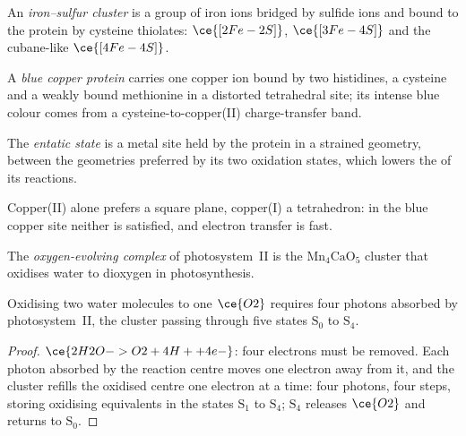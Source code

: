 \begin{definition}\label{def:b3:bioinorganic:fes}
An \emph{iron--sulfur cluster} is a group of iron
ions bridged by sulfide ions and bound to the protein by cysteine thiolates:
$\ce{[2Fe-2S]}$, $\ce{[3Fe-4S]}$ and the cubane-like $\ce{[4Fe-4S]}$.
\end{definition}

\begin{definition}\label{def:b3:bioinorganic:blue-copper}
A \emph{blue copper protein} carries one copper
ion bound by two histidines, a cysteine and a weakly bound methionine in a
distorted tetrahedral site; its intense blue colour comes from a
cysteine-to-copper(II) charge-transfer band.
\end{definition}

\begin{definition}\label{def:b3:bioinorganic:entatic}
The \emph{entatic state} is a metal site held by the
protein in a strained geometry, between the geometries preferred by its two
oxidation states, which lowers the  of its reactions.
\end{definition}

Copper(II) alone prefers a square plane, copper(I) a tetrahedron: in the blue
copper site neither is satisfied, and electron transfer is fast.

\begin{definition}\label{def:b3:bioinorganic:oec}
The \emph{oxygen-evolving complex} of
photosystem~II is the $\mathrm{Mn_4CaO_5}$ cluster that oxidises water to dioxygen in
photosynthesis.
\end{definition}

\begin{proposition}\label{prop:b3:bioinorganic:kok}
Oxidising two water molecules to one $\ce{O2}$ requires four photons absorbed by
photosystem~II, the cluster passing through five states $\mathrm S_0$ to $\mathrm S_4$.
\end{proposition}

\begin{proof}
$\ce{2H2O -> O2 + 4H+ + 4e-}$: four electrons must be removed. Each photon absorbed by the
reaction centre moves one electron away from it, and the cluster refills the
oxidised centre one electron at a time: four photons, four steps, storing
oxidising equivalents in the states $\mathrm S_1$ to $\mathrm S_4$; $\mathrm S_4$ releases $\ce{O2}$ and returns to $\mathrm S_0$.
\end{proof}

